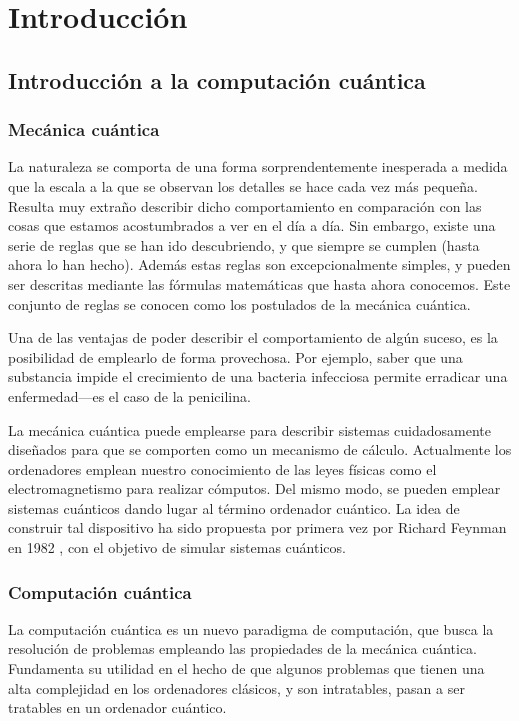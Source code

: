 \chapter{Introducción}

\section{Introducción a la computación cuántica}

\subsection{Mecánica cuántica}
La naturaleza se comporta de una forma sorprendentemente inesperada a medida que 
la escala a la que se observan los detalles se hace cada vez más pequeña.  
Resulta muy extraño describir dicho comportamiento en comparación con las cosas 
que estamos acostumbrados a ver en el día a día. Sin embargo, existe una serie 
de reglas que se han ido descubriendo, y que siempre se cumplen (hasta ahora lo 
han hecho). Además estas reglas son excepcionalmente simples, y pueden ser 
descritas mediante las fórmulas matemáticas que hasta ahora conocemos. Este 
conjunto de reglas se conocen como los postulados de la mecánica cuántica.

Una de las ventajas de poder describir el comportamiento de algún suceso, es la 
posibilidad de emplearlo de forma provechosa. Por ejemplo, saber que una 
substancia impide el crecimiento de una bacteria infecciosa permite erradicar 
una enfermedad---es el caso de la penicilina.

La mecánica cuántica puede emplearse para describir sistemas cuidadosamente 
diseñados para que se comporten como un mecanismo de cálculo. Actualmente los 
ordenadores emplean nuestro conocimiento de las leyes físicas como el 
electromagnetismo para realizar cómputos. Del mismo modo, se pueden emplear 
sistemas cuánticos dando lugar al término ordenador cuántico. La idea de 
construir tal dispositivo ha sido propuesta por primera vez por Richard Feynman 
en 1982 \cite{feynman-sim}, con el objetivo de simular sistemas cuánticos.

\subsection{Computación cuántica}
La computación cuántica es un nuevo paradigma de computación, que busca la
resolución de problemas empleando las propiedades de la mecánica cuántica.
Fundamenta su utilidad en el hecho de que algunos problemas que tienen una alta
complejidad en los ordenadores clásicos, y son intratables, pasan a ser
tratables en un ordenador cuántico.

